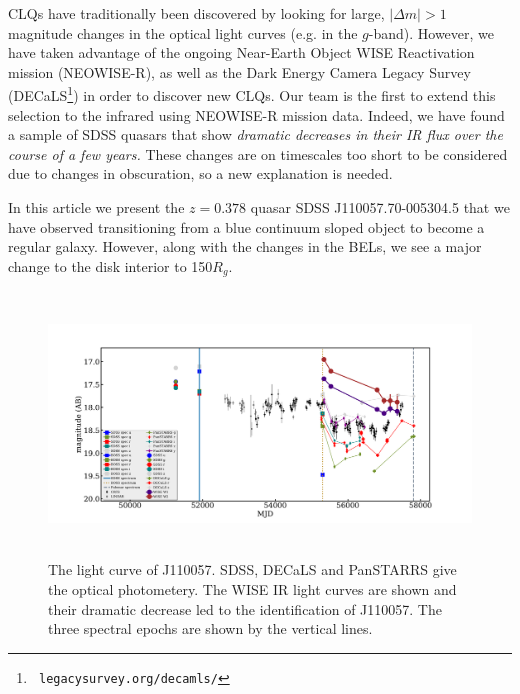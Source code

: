 \documentclass{nature}
\begin{document}
CLQs have traditionally been discovered by looking for large, $|
\Delta m | >1$ magnitude changes in the optical light curves (e.g. in
the $g$-band). However, we have taken advantage of the ongoing
Near-Earth Object WISE Reactivation mission
(NEOWISE-R)\cite{Mainzer14, Meisner17, Meisner17b}, as well as the
Dark Energy Camera Legacy Survey (DECaLS\footnote{{\tt
legacysurvey.org/decamls/}}) in order to discover new CLQs. Our team
is the first to extend this selection to the infrared using NEOWISE-R
mission data. Indeed, we have found a sample of SDSS quasars that show
{\it dramatic decreases in their IR flux over the course of a few
years.}  These changes are on timescales too short to be considered
due to changes in obscuration, so a new explanation is needed.

In this article we present the $z=0.378$ quasar SDSS
J110057.70-005304.5 that we have observed transitioning from a blue
continuum sloped object to become a regular galaxy. However, along
with the changes in the BELs, we see a major change to the disk
interior to 150$R_{g}$.
 
\begin{figure}
  \centering
  \includegraphics[width=16.00cm, height=7.00cm, trim=0.0cm 0.0cm 0.0cm 0.0cm, clip]
  {../plots/lc/J110057_lc_20171006v1.pdf}
  \caption[]{The light curve of J110057. SDSS, DECaLS and PanSTARRS
    give the optical photometery. The WISE IR light curves are shown and
    their dramatic decrease led to the identification of J110057. The
    three spectral epochs are shown by the vertical lines.}
  \label{fig:J110057_LC_CRTS}
\end{figure}
\end{document}
